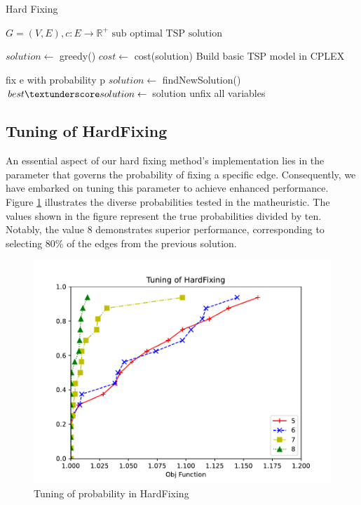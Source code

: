 \begin{algorithm}
    \caption{Hard Fixing}\label{algo:HardFixing}
    \begin{algorithmic}[1]
    \Require $G = (V,E), c:E \to \mathbb{R}^+$
    \Ensure $\text{sub optimal TSP solution}$

    \State $solution \gets$ greedy()
    \State $cost \gets $ cost(solution)
    \State Build basic TSP model in CPLEX



    \State fix e with probability p
    \EndFor
    \State $solution \gets$ findNewSolution()
    \State $ best\textunderscore solution \gets$ solution
    \EndIf
    \State unfix all variables
    \EndWhile

    \end{algorithmic}
\end{algorithm}

\subsection{Tuning of HardFixing}
An essential aspect of our hard fixing method's implementation lies in the parameter that governs the probability of fixing a specific edge. Consequently, we have embarked on tuning this parameter to achieve enhanced performance.
\\
Figure \ref{fig:hard} illustrates the diverse probabilities tested in the matheuristic. The values shown in the figure represent the true probabilities divided by ten. Notably, the value 8 demonstrates superior performance, corresponding to selecting 80\% of the edges from the previous solution.
\begin{figure}[!h]
    \centering
    \includegraphics[width=\textwidth]{images/hard.pdf}
    \caption{Tuning of probability in HardFixing}
    \label{fig:hard}
\end{figure}


